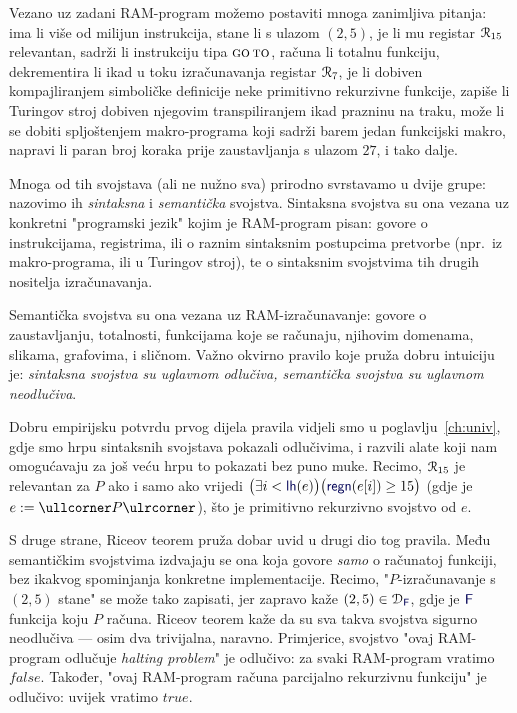 Vezano uz zadani RAM-program možemo postaviti mnoga zanimljiva pitanja: ima li više od milijun instrukcija, stane li s ulazom $(2,5)$, je li mu registar $\mathcal R_{15}$ relevantan, sadrži li instrukciju tipa $\textsc{go\,to}$, računa li totalnu funkciju, dekrementira li ikad u toku izračunavanja registar $\mathcal R_{7}$, je li dobiven kompajliranjem simboličke definicije neke primitivno rekurzivne funkcije, zapiše li Turingov stroj dobiven njegovim transpiliranjem ikad prazninu na traku, može li se dobiti spljoštenjem makro-programa koji sadrži barem jedan funkcijski makro, napravi li paran broj koraka prije zaustavljanja s ulazom $27$, i tako dalje.

Mnoga od tih svojstava (ali ne nužno sva) prirodno svrstavamo u dvije grupe: nazovimo ih \emph{sintaksna} i \emph{semantička} svojstva. Sintaksna svojstva su ona vezana uz konkretni "programski jezik" kojim je RAM-program pisan: govore o instrukcijama, registrima, ili o raznim sintaksnim postupcima pretvorbe (npr.\ iz makro-programa, ili u Turingov stroj), te o sintaksnim svojstvima tih drugih nositelja izračunavanja.

Semantička svojstva su ona vezana uz RAM-izračunavanje: govore o zaustavljanju, totalnosti, funkcijama koje se računaju, njihovim domenama, slikama, grafovima, i sličnom. Važno okvirno pravilo koje pruža dobru intuiciju je: \emph{sintaksna svojstva su uglavnom odlučiva, semantička svojstva su uglavnom neodlučiva}.

Dobru empirijsku potvrdu prvog dijela pravila vidjeli smo u poglavlju~\ref{ch:univ}, gdje smo hrpu sintaksnih svojstava pokazali odlučivima, i razvili alate koji nam omogućavaju za još veću hrpu to pokazati bez puno muke. Recimo, $\mathcal R_{15}$ je relevantan za $P$ ako i samo ako vrijedi 
$\bigl(\exists i<\f{lh}(e)\bigr)\bigl(\f{regn}(e[i])\ge15\bigr)$ (gdje je $e:=\kprog P$), što je primitivno rekurzivno svojstvo od $e$.

S druge strane, Riceov teorem pruža dobar uvid u drugi dio tog pravila. Među semantičkim svojstvima izdvajaju se ona koja govore \emph{samo} o računatoj funkciji, bez ikakvog spominjanja konkretne implementacije. Recimo, "$P$-izračunavanje s $(2,5)$ stane" se može tako zapisati, jer zapravo kaže $(2,5)\in\dom{\f F}$, gdje je $\f F$ funkcija koju $P$ računa. Riceov teorem kaže da su sva takva svojstva sigurno neodlučiva --- osim dva trivijalna, naravno. Primjerice, svojstvo "ovaj RAM-program odlučuje \emph{halting problem}" je odlučivo: za svaki RAM-program vratimo $\mathit{false}$. Također, "ovaj RAM-program računa parcijalno rekurzivnu funkciju" je odlučivo: uvijek vratimo $\mathit{true}$.

